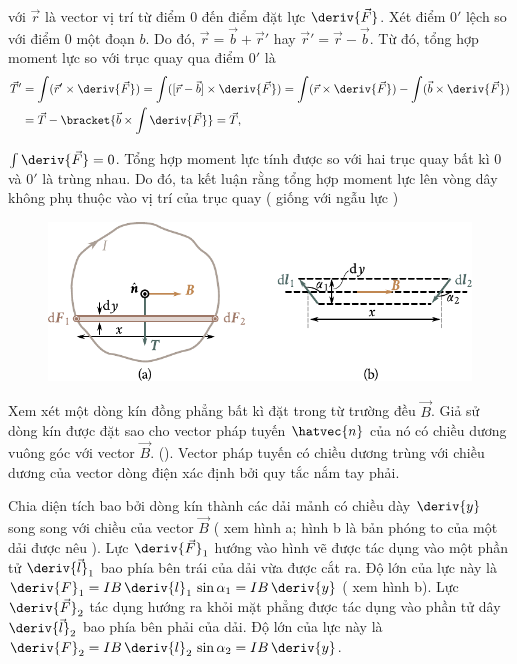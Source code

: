 \noindent
với $\vec{r}$ là vector vị trí từ điểm $0$ đến điểm đặt lực $\deriv{\vec{F}}$. Xét điểm $0'$ lệch so với điểm $0$ một đoạn $b$. Do đó, $\vec{r}=\vec{b}+\vec{r}'$ hay $\vec{r}'=\vec{r}-\vec{b}$. Từ đó, tổng hợp moment lực so với trục quay qua điểm $0'$ là 
\begin{align*}
    \vec{T}' &=  \int (\vec{r}' \times \deriv{\vec{F}}) = \int ([\vec{r} - \vec{b}] \times \deriv{\vec{F}}) = \int (\vec{r} \times \deriv{\vec{F}}) - \int (\vec{b} \times \deriv{\vec{F}})\\
    &= \vec{T} - \bracket{ \vec{b} \times \int \deriv{\vec{F}} } = \vec{T},
\end{align*}

\noindent
$\int\deriv{\vec{F}}=0$. Tổng hợp moment lực tính được so với hai trục quay bất kì $0$ và $0'$ là trùng nhau. Do đó, ta kết luận rằng tổng hợp moment lực lên vòng dây không phụ thuộc vào vị trí của trục quay ( giống với ngẫu lực ) 
\begin{figure}[t]
	\begin{center}
		\includegraphics[scale=1]{figures/ch_06/fig_6_14.pdf}
		\caption[]{}
		\label{fig:6_14}
	\end{center}
	\vspace{-0.8cm}
\end{figure}

Xem xét một dòng kín đồng phẳng bất kì đặt trong từ trường đều $\vec{B}$. Giả sử dòng kín được đặt sao cho vector pháp tuyến $\hatvec{n}$ của nó có chiều dương vuông góc với vector $\vec{B}$. (). Vector pháp tuyến có chiều dương trùng với chiều dương của vector dòng điện xác định bởi quy tắc nắm tay phải.

Chia diện tích bao bởi dòng kín thành các dải mảnh có chiều dày $\deriv{y}$ song song với chiều của vector $\vec{B}$ ( xem hình a; hình b là bản phóng to của một dải được nêu ). Lực $\deriv{\vec{F}}_1$ hướng vào hình vẽ được tác dụng vào một phần tử $\deriv{\vec{l}}_1$   bao phía bên trái của dải vừa được cắt ra. Độ lớn của lực này là $\deriv{F}_1 = IB\, \deriv{l}_1\, \sin\alpha_1 = IB\, \deriv{y}$ ( xem hình b).
Lực  $\deriv{\vec{F}}_2$ tác dụng hướng ra khỏi mặt phẳng được tác dụng vào phần tử dây $\deriv{\vec{l}}_2$ bao phía bên phải của dải. Độ lớn của lực này là  $\deriv{F}_2 = IB\, \deriv{l}_2\, \sin\alpha_2 = IB\, \deriv{y}$.

